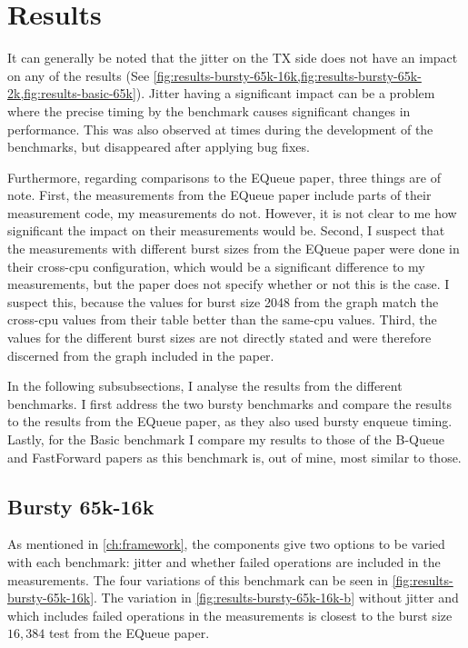 \section{Results}
It can generally be noted that the jitter on the TX side does not have an impact on any of the results
(See \cref{fig:results-bursty-65k-16k,fig:results-bursty-65k-2k,fig:results-basic-65k}).
Jitter having a significant impact can be a problem where the precise timing by the benchmark causes
significant changes in performance.
This was also observed at times during the development of the benchmarks, but disappeared after applying bug fixes.

Furthermore, regarding comparisons to the EQueue paper, three things are of note.
First, the measurements from the EQueue paper include parts of their measurement code, my measurements do
not\cite{EQueueGithub}.
However, it is not clear to me how significant the impact on their measurements would be.
Second, I suspect that the measurements with different burst sizes from the EQueue paper were done in their
cross-cpu configuration,
which would be a significant difference to my measurements, but the paper does not specify whether or not
this is the case.
I suspect this, because the values for burst size 2048 from the graph match the cross-cpu values from their
table better than the same-cpu values.
Third, the values for the different burst sizes are not directly stated and were therefore discerned from the
graph included in the paper.

In the following subsubsections, I analyse the results from the different benchmarks.
I first address the two bursty benchmarks and compare the results to the results from the EQueue paper, as
they also used bursty enqueue timing.
Lastly, for the Basic benchmark I compare my results to those of the B-Queue and FastForward papers as this
benchmark is, out of mine, most similar to those.

\subsection{Bursty 65k-16k}

As mentioned in \autoref{ch:framework}, the components give two options to be varied with each benchmark:
jitter and whether failed operations are included in the measurements.
The four variations of this benchmark can be seen in \autoref{fig:results-bursty-65k-16k}.
The variation in \autoref{fig:results-bursty-65k-16k-b} without jitter and which includes failed operations
in the measurements is closest to the burst size $16,384$ test from the EQueue paper\cite{EQueue}.

